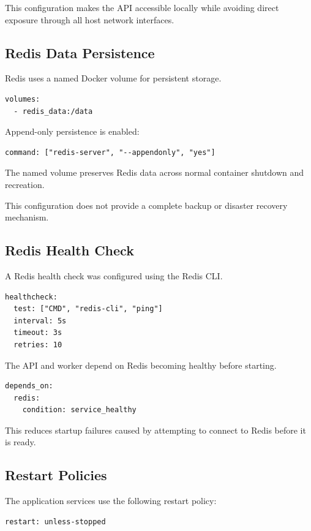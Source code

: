 \documentclass[11pt,a4paper]{article}
\begin{document}
This configuration makes the API accessible locally
while avoiding direct exposure through all host
network interfaces.

\subsection{Redis Data Persistence}

Redis uses a named Docker volume for persistent
storage.

\begin{lstlisting}
volumes:
  - redis_data:/data
\end{lstlisting}

Append-only persistence is enabled:

\begin{lstlisting}
command: ["redis-server", "--appendonly", "yes"]
\end{lstlisting}

The named volume preserves Redis data across normal
container shutdown and recreation.

This configuration does not provide a complete backup
or disaster recovery mechanism.

\subsection{Redis Health Check}

A Redis health check was configured using the
Redis CLI.

\begin{lstlisting}
healthcheck:
  test: ["CMD", "redis-cli", "ping"]
  interval: 5s
  timeout: 3s
  retries: 10
\end{lstlisting}

The API and worker depend on Redis becoming healthy
before starting.

\begin{lstlisting}
depends_on:
  redis:
    condition: service_healthy
\end{lstlisting}

This reduces startup failures caused by attempting to
connect to Redis before it is ready.

\subsection{Restart Policies}

The application services use the following restart
policy:

\begin{lstlisting}
restart: unless-stopped
\end{lstlisting}
\end{document}
